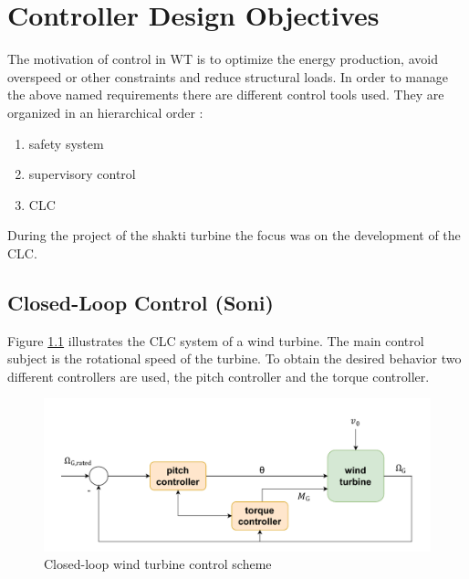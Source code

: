 \chapter{Controller Design Objectives}
The motivation of control in \gls{WT} is to optimize the energy production, avoid overspeed or other constraints and reduce structural loads. \cite{SchlipfLecture}
In order to manage the above named requirements there are different control tools used.
They are organized in an hierarchical order \cite{WindEnergyHandbook}:
\begin{enumerate} 
	\item safety system
	\item supervisory control
	\item \gls{CLC}
\end{enumerate} 
During the project of the \gls{shakti} turbine the focus was on the development of the \gls{CLC}.
\section{Closed-Loop Control (Soni)} \label{Advanced controller}
Figure \ref{fig:Closed-loop Wind Turbine Control} illustrates the \gls{CLC} system of a wind turbine.
The main control subject is the rotational speed of the turbine.
To obtain the desired behavior two different controllers are used, the pitch controller and the torque controller.

\begin{figure}[h]
	\centering
	\includegraphics[width=\textwidth]{Figures/Control_loop}
	\caption{Closed-loop wind turbine control scheme}
	\label{fig:Closed-loop Wind Turbine Control}
\end{figure}

